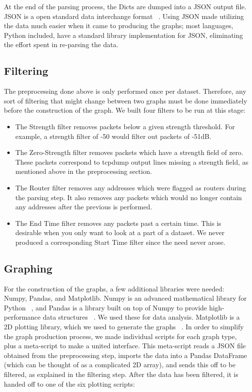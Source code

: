 At the end of the parsing process, the Dicts are dumped into a JSON output file.
JSON is a open standard data interchange format ~\cite{json}.
Using JSON made utilizing the data much easier when it came to producing the graphs; most languages, Python included, have a standard library implementation for JSON, eliminating the effort spent in re-parsing the data. %

\subsection{Filtering}
The preprocessing done above is only performed once per dataset.
Therefore, any sort of filtering that might change between two graphs must be done immediately before the construction of the graph.
We built four filters to be run at this stage:
\begin{itemize}
\item The Strength filter removes packets below a given strength threshold.
  For example, a strength filter of -50 would filter out packets of -51dB.
\item The Zero-Strength filter removes packets which have a strength field of zero.
  These packets correspond to tcpdump output lines missing a strength field, as mentioned above in the preprocessing section.
\item The Router filter removes any addresses which were flagged as routers during the parsing step.
  It also removes any packets which would no longer contain any addresses after the previous is performed.
\item The End Time filter removes any packets past a certain time.
  This is desirable when you only want to look at a part of a dataset.
  We never produced a corresponding Start Time filter since the need never arose.
\end{itemize}

\subsection{Graphing}
For the construction of the graphs, a few additional libraries were needed: Numpy, Pandas, and Matplotlib.
Numpy is an advanced mathematical library for Python ~\cite{numpy}, and Pandas is a library built on top of Numpy to provide high-performance data structures ~\cite{pandas}.
We used these for data analysis.
Matplotlib is a 2D plotting library, which we used to generate the graphs ~\cite{matplotlib}. 
In order to simplify the graph production process, we made individual scripts for each graph type, plus a meta-script to make a united interface.
This meta-script reads a JSON file obtained from the preprocessing step, imports the data into a Pandas DataFrame (which can be thought of as a complicated 2D array), and sends this off to be filtered, as explained in the filtering step.
After the data has been filtered, it is handed off to one of the six plotting scripts:

